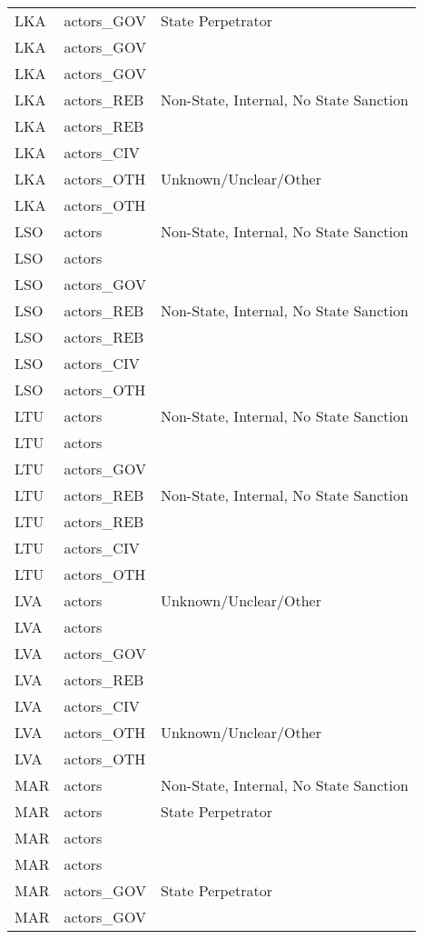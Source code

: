 \begin{table}[ht]
\begin{tabular}{lll}
  LKA & actors\_GOV & State Perpetrator \\ 
  LKA & actors\_GOV &  \\ 
  LKA & actors\_GOV &  \\ 
  LKA & actors\_REB & Non-State, Internal, No State Sanction \\ 
  LKA & actors\_REB &  \\ 
  LKA & actors\_CIV &  \\ 
  LKA & actors\_OTH & Unknown/Unclear/Other \\ 
  LKA & actors\_OTH &  \\ 
  LSO & actors & Non-State, Internal, No State Sanction \\ 
  LSO & actors &  \\ 
  LSO & actors\_GOV &  \\ 
  LSO & actors\_REB & Non-State, Internal, No State Sanction \\ 
  LSO & actors\_REB &  \\ 
  LSO & actors\_CIV &  \\ 
  LSO & actors\_OTH &  \\ 
  LTU & actors & Non-State, Internal, No State Sanction \\ 
  LTU & actors &  \\ 
  LTU & actors\_GOV &  \\ 
  LTU & actors\_REB & Non-State, Internal, No State Sanction \\ 
  LTU & actors\_REB &  \\ 
  LTU & actors\_CIV &  \\ 
  LTU & actors\_OTH &  \\ 
  LVA & actors & Unknown/Unclear/Other \\ 
  LVA & actors &  \\ 
  LVA & actors\_GOV &  \\ 
  LVA & actors\_REB &  \\ 
  LVA & actors\_CIV &  \\ 
  LVA & actors\_OTH & Unknown/Unclear/Other \\ 
  LVA & actors\_OTH &  \\ 
  MAR & actors & Non-State, Internal, No State Sanction \\ 
  MAR & actors & State Perpetrator \\ 
  MAR & actors &  \\ 
  MAR & actors &  \\ 
  MAR & actors\_GOV & State Perpetrator \\ 
  MAR & actors\_GOV &  \\ 

\end{tabular}
\end{table}
